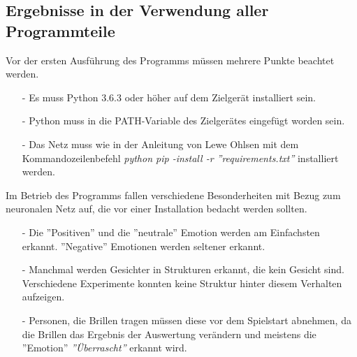 \documentclass[12pt,a4paper,headinclude,twoside, plainheadsepline, open=right,numbers=noenddot]{scrreprt}
\begin{document}
\subsection{Ergebnisse in der Verwendung aller Programmteile}
Vor der ersten Ausf\"{u}hrung des Programms m\"{u}ssen mehrere Punkte beachtet werden.
\begin{itemize}
\item[-] Es muss Python 3.6.3 oder h\"{o}her auf dem Zielger\"{a}t installiert sein.
\item[-] Python muss in die PATH-Variable des Zielger\"{a}tes eingef\"{u}gt worden sein.
\item[-] Das Netz muss wie in der Anleitung\cite{LeweOhlsenGit} von Lewe Ohlsen mit dem Kommandozeilenbefehl \textit{python pip -install -r ''requirements.txt''} installiert werden.
\end{itemize} 
Im Betrieb des Programms fallen verschiedene Besonderheiten mit Bezug zum neuronalen Netz auf, die vor einer Installation bedacht werden sollten.
\begin{itemize}
\item[-] Die ''Positiven'' und die ''neutrale'' Emotion werden am Einfachsten erkannt. ''Negative'' Emotionen werden seltener erkannt.
\item[-] Manchmal werden Gesichter in Strukturen erkannt, die kein Gesicht sind. Verschiedene Experimente konnten keine Struktur hinter diesem Verhalten aufzeigen.
\item[-] Personen, die Brillen tragen m\"{u}ssen diese vor dem Spielstart abnehmen, da die Brillen das Ergebnis der Auswertung ver\"{a}ndern und meistens die ''Emotion'' \textit{''\"{U}berrascht''} erkannt wird. 
\end{itemize}
\end{document}
